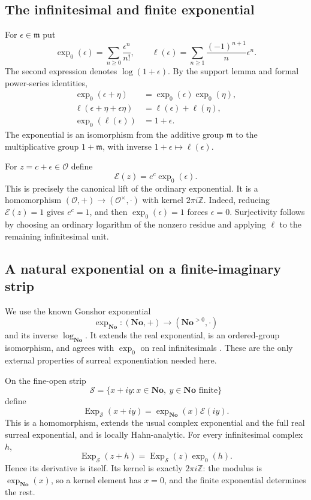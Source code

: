 \documentclass[11pt,a4paper]{article}
\numberwithin{equation}{section}
\theoremstyle{definition}
\theoremstyle{remark}
\newcommand{\No}{\mathbf{No}}
\newcommand{\Z}{\mathbb Z}
\newcommand{\OO}{\mathcal O}
\newcommand{\mm}{\mathfrak m}
\newcommand{\E}{\mathcal E}
\begin{document}
\subsection{The infinitesimal and finite exponential}
For $\epsilon\in\mm$ put
\[
 \exp_0(\epsilon)=\sum_{n\geq0}\frac{\epsilon^n}{n!},
 \qquad
 \ell(\epsilon)=\sum_{n\geq1}\frac{(-1)^{n+1}}n\epsilon^n.
\]
The second expression denotes $\log(1+\epsilon)$. By the support lemma and formal power-series identities,
\begin{align*}
 \exp_0(\epsilon+\eta)&=\exp_0(\epsilon)\exp_0(\eta),\\
 \ell(\epsilon+\eta+\epsilon\eta)&=\ell(\epsilon)+\ell(\eta),\\
 \exp_0(\ell(\epsilon))&=1+\epsilon.
\end{align*}
The exponential is an isomorphism from the additive group $\mm$ to the multiplicative group $1+\mm$, with inverse $1+\epsilon\mapsto\ell(\epsilon)$.

For $z=c+\epsilon\in\OO$ define
\begin{equation}
\label{eq:finiteexp}
 \E(z)=e^c\exp_0(\epsilon).
\end{equation}
This is precisely the canonical lift of the ordinary exponential. It is a homomorphism $(\OO,+)\to(\OO^\times,\cdot)$ with kernel $2\pi i\Z$. Indeed, reducing $\E(z)=1$ gives $e^c=1$, and then $\exp_0(\epsilon)=1$ forces $\epsilon=0$. Surjectivity follows by choosing an ordinary logarithm of the nonzero residue and applying $\ell$ to the remaining infinitesimal unit.

\subsection{A natural exponential on a finite-imaginary strip}
We use the known Gonshor exponential
\[
 \exp_{\No}:(\No,+)\longrightarrow(\No^{>0},\cdot)
\]
and its inverse $\log_{\No}$. It extends the real exponential, is an ordered-group isomorphism, and agrees with $\exp_0$ on real infinitesimals \cite{Gonshor,BMderiv}. These are the only external properties of surreal exponentiation needed here.

On the fine-open strip
\[
 \mathcal S=\{x+iy:x\in\No,\ y\in\No\text{ finite}\}
\]
define
\begin{equation}
\label{eq:stripexp}
 \operatorname{Exp}_{\mathcal S}(x+iy)
 =\exp_{\No}(x)\E(iy).
\end{equation}
This is a homomorphism, extends the usual complex exponential and the full real surreal exponential, and is locally Hahn-analytic. For every infinitesimal complex $h$,
\[
 \operatorname{Exp}_{\mathcal S}(z+h)
 =\operatorname{Exp}_{\mathcal S}(z)\exp_0(h).
\]
Hence its derivative is itself. Its kernel is exactly $2\pi i\Z$: the modulus is $\exp_{\No}(x)$, so a kernel element has $x=0$, and the finite exponential determines the rest.
\end{document}
